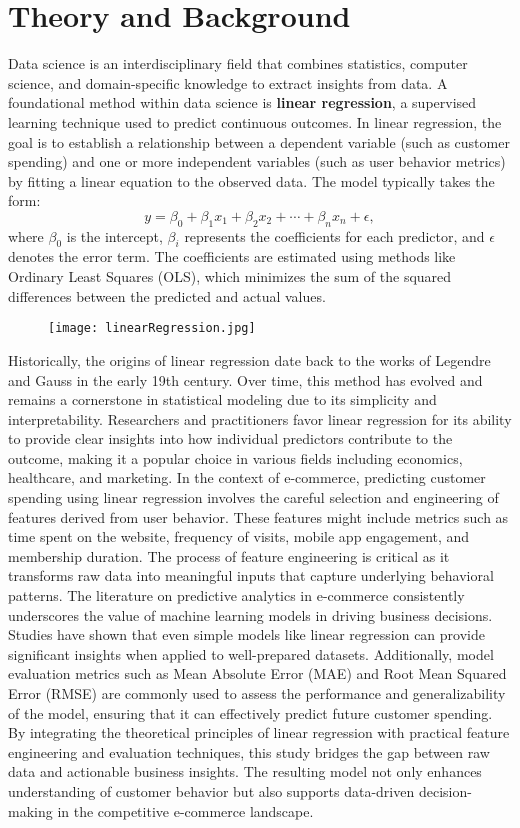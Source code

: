\documentclass[12pt]{article}
\begin{document}
\section{Theory and Background}
Data science is an interdisciplinary field that combines statistics, computer science, and domain-specific knowledge to extract insights from data. A foundational method within data science is \textbf{linear regression}, a supervised learning technique used to predict continuous outcomes. In linear regression, the goal is to establish a relationship between a dependent variable (such as customer spending) and one or more independent variables (such as user behavior metrics) by fitting a linear equation to the observed data. The model typically takes the form:
\[
y = \beta_0 + \beta_1 x_1 + \beta_2 x_2 + \cdots + \beta_n x_n + \epsilon,
\]
where $\beta_0$ is the intercept, $\beta_i$ represents the coefficients for each predictor, and $\epsilon$ denotes the error term. The coefficients are estimated using methods like Ordinary Least Squares (OLS), which minimizes the sum of the squared differences between the predicted and actual values.


\begin{figure}[H]
    \centering
    \texttt{[image: linearRegression.jpg]}
\end{figure}


Historically, the origins of linear regression date back to the works of Legendre and Gauss in the early 19th century. Over time, this method has evolved and remains a cornerstone in statistical modeling due to its simplicity and interpretability. Researchers and practitioners favor linear regression for its ability to provide clear insights into how individual predictors contribute to the outcome, making it a popular choice in various fields including economics, healthcare, and marketing.
In the context of e-commerce, predicting customer spending using linear regression involves the careful selection and engineering of features derived from user behavior. These features might include metrics such as time spent on the website, frequency of visits, mobile app engagement, and membership duration. The process of feature engineering is critical as it transforms raw data into meaningful inputs that capture underlying behavioral patterns.
The literature on predictive analytics in e-commerce consistently underscores the value of machine learning models in driving business decisions. Studies have shown that even simple models like linear regression can provide significant insights when applied to well-prepared datasets. Additionally, model evaluation metrics such as Mean Absolute Error (MAE) and Root Mean Squared Error (RMSE) are commonly used to assess the performance and generalizability of the model, ensuring that it can effectively predict future customer spending.
By integrating the theoretical principles of linear regression with practical feature engineering and evaluation techniques, this study bridges the gap between raw data and actionable business insights. The resulting model not only enhances understanding of customer behavior but also supports data-driven decision-making in the competitive e-commerce landscape.
\end{document}
